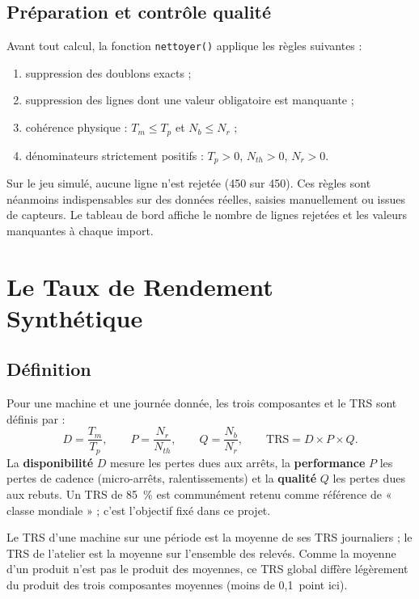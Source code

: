 \documentclass[11pt,a4paper]{article}
\newcommand{\code}[1]{\texttt{#1}}
\newcommand{\pct}[1]{#1~\%}
\begin{document}
\subsection{Préparation et contrôle qualité}
Avant tout calcul, la fonction \code{nettoyer()} applique les règles suivantes :
\begin{enumerate}
  \item suppression des doublons exacts ;
  \item suppression des lignes dont une valeur obligatoire est manquante ;
  \item cohérence physique : $T_m \le T_p$ et $N_b \le N_r$ ;
  \item dénominateurs strictement positifs : $T_p > 0$, $N_{th} > 0$, $N_r > 0$.
\end{enumerate}
Sur le jeu simulé, aucune ligne n'est rejetée (450 sur 450). Ces règles sont néanmoins
indispensables sur des données réelles, saisies manuellement ou issues de capteurs. Le tableau de
bord affiche le nombre de lignes rejetées et les valeurs manquantes à chaque import.

\section{Le Taux de Rendement Synthétique}

\subsection{Définition}
Pour une machine et une journée donnée, les trois composantes et le TRS sont définis par :
\begin{equation}
D = \frac{T_m}{T_p}, \qquad
P = \frac{N_r}{N_{th}}, \qquad
Q = \frac{N_b}{N_r}, \qquad
\mathrm{TRS} = D \times P \times Q .
\label{eq:trs}
\end{equation}
La \textbf{disponibilité} $D$ mesure les pertes dues aux arrêts, la \textbf{performance} $P$ les
pertes de cadence (micro-arrêts, ralentissements) et la \textbf{qualité} $Q$ les pertes dues aux
rebuts. Un TRS de \pct{85} est communément retenu comme référence de « classe mondiale » ; c'est
l'objectif fixé dans ce projet.

Le TRS d'une machine sur une période est la moyenne de ses TRS journaliers ; le TRS de l'atelier
est la moyenne sur l'ensemble des relevés. Comme la moyenne d'un produit n'est pas le produit des
moyennes, ce TRS global diffère légèrement du produit des trois composantes moyennes (moins de
0,1~point ici).
\end{document}
